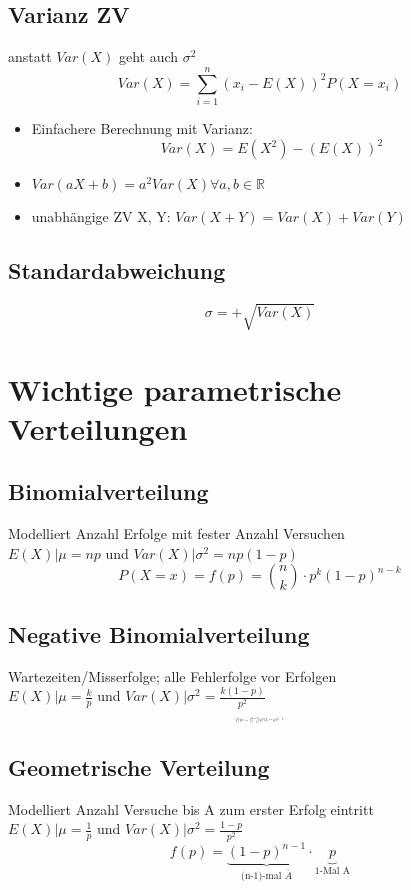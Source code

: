\documentclass[10pt,a4paper,landscape]{article}
\begin{document}
\begin{multicols}{4}
\subsection{Varianz ZV}
anstatt $Var(X)$ geht auch $\sigma^2$
\[
Var(X) = \sum_{i=1}^n (x_i - E(X))^2P(X=x_i)
\]

\begin{itemize}
\item Einfachere Berechnung mit Varianz:
\[
Var(X)=E(X^2)-(E(X))^2
\]
\item $Var(aX+b)=a^2Var(X) \forall a,b \in \mathbb{R}$
\item unabhängige ZV X, Y: $Var(X+Y)=Var(X)+Var(Y)$
\end{itemize}

\subsection{Standardabweichung}
\[
\sigma = + \sqrt{Var(X)}
\]


\section{Wichtige parametrische Verteilungen}

\subsection{Binomialverteilung}
Modelliert Anzahl Erfolge mit fester Anzahl Versuchen\\
$E(X)|\mu=np$ und $Var(X)|\sigma^2=np(1-p)$
\[
P(X=x)=f(p)=\binom{n}{k} \cdot p^k(1-p)^{n-k}
\]


\subsection{Negative Binomialverteilung}
Wartezeiten/Misserfolge; alle Fehlerfolge vor Erfolgen \\
$E(X)|\mu=\frac{k}{p}$ und $Var(X)|\sigma^2=\frac{k(1-p)}{p^2}$
\[\resizebox{0.1\textwidth}{!}{$
f(p)=\binom{n-1}{k-1}p ^k(1-p)^{n-k}
$}
\]


\subsection{Geometrische Verteilung}
Modelliert Anzahl Versuche bis A zum erster Erfolg eintritt\\
$E(X)|\mu=\frac{1}{p}$ und $Var(X)|\sigma^2=\frac{1-p}{p^2}$
\[
f(p)= \underbrace{(1 - p)^{n-1}}_{\text{(n-1)-mal } \overline{A}}
 \cdot \underbrace{p}_{\text{1-Mal A}}
\]


\end{multicols}
\end{document}
